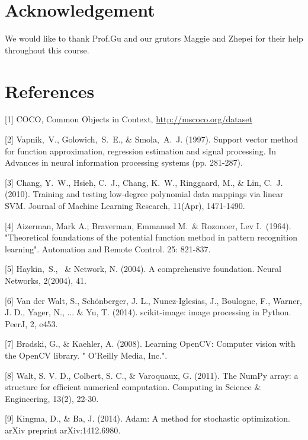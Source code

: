 \documentclass{article}
\begin{document}
\section*{Acknowledgement}
We would like to thank Prof.Gu and our grutors Maggie and Zhepei for their help throughout this course.

\section*{References}
\small
[1] COCO, Common Objects in Context, \url{http://mscoco.org/dataset}

[2] Vapnik,\ V., Golowich,\ S.\ E., \& Smola,\ A.\ J. (1997). Support vector method for function approximation, regression estimation and signal processing. In Advances in neural information processing systems (pp. 281-287). 

[3] Chang, Y.\ W., Hsieh, C.\ J., Chang, K.\ W., Ringgaard, M., \& Lin, C.\ J. (2010). Training and testing low-degree polynomial data mappings via linear SVM. Journal of Machine Learning Research, 11(Apr), 1471-1490. 

[4]   Aizerman, Mark A.; Braverman, Emmanuel M.\ \& Rozonoer, Lev I.\ (1964). "Theoretical foundations of the potential function method in pattern recognition learning". Automation and Remote Control. 25: 821-837.

[5] Haykin,\  S., \ \& Network, N. (2004). A comprehensive foundation. Neural Networks, 2(2004), 41.

[6] Van der Walt, S., Schönberger, J. L., Nunez-Iglesias, J., Boulogne, F., Warner, J. D., Yager, N., ... \& Yu, T. (2014). scikit-image: image processing in Python. PeerJ, 2, e453.

[7] Bradski, G., $\&$ Kaehler, A. (2008). Learning OpenCV: Computer vision with the OpenCV library. " O'Reilly Media, Inc.".

[8] Walt, S. V. D., Colbert, S. C., $\&$ Varoquaux, G. (2011). The NumPy array: a structure for efficient numerical computation. Computing in Science $\&$ Engineering, 13(2), 22-30.

[9] Kingma, D., $\&$ Ba, J. (2014). Adam: A method for stochastic optimization. arXiv preprint arXiv:1412.6980.
\end{document}
